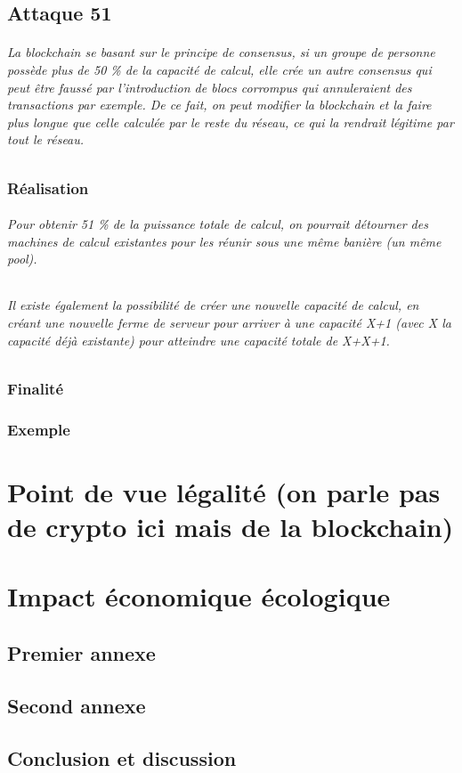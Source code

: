 \documentclass[12pt, a4paper, oneside]{book}
\begin{document}
    \chapter{Attaque 51}
    \paragraph{La blockchain se basant sur le principe de consensus, si un groupe de personne possède plus de 50 \% de la capacité de calcul, elle crée un autre consensus qui peut être faussé par l'introduction de blocs corrompus qui annuleraient des transactions par exemple. De ce fait, on peut modifier la blockchain et la faire plus longue que celle calculée par le reste du réseau, ce qui la rendrait légitime par tout le réseau.}
    \section{Réalisation}
    \paragraph{Pour obtenir 51 \% de la puissance totale de calcul, on pourrait détourner des machines de calcul existantes pour les réunir sous une même banière (un même pool).}

    
    \paragraph{Il existe également la possibilité de créer une nouvelle capacité de calcul, en créant une nouvelle ferme de serveur pour arriver à une capacité X+1 (avec X la capacité déjà existante) pour atteindre une capacité totale de X+X+1.}
    \section{Finalité}
    \section{Exemple}

    \part{Point de vue légalité (on parle pas de crypto ici mais de la blockchain)}

    \part{Impact économique écologique}
 
    \appendix
 
    \chapter{Premier annexe}
    \chapter{Second annexe}
 
    
    \backmatter
 
    \chapter{Conclusion et discussion}
 
    
    \tableofcontents

    
    
 
\end{document}
